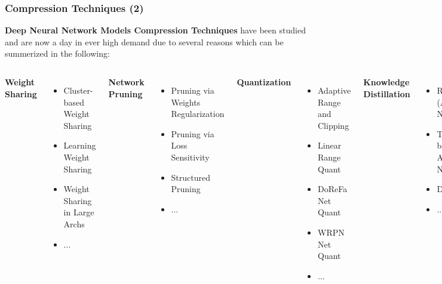 



\begin{frame}

\frametitle{Compression Techniques (2)}

\textbf{Deep Neural Network Models Compression Techniques} have been studied and are now a day in ever high demand due to several reasons which can be summerized in the following:

\begin{columns}

\textbf{Weight Sharing}
\begin{itemize}
\item Cluster-based Weight Sharing
\item Learning Weight Sharing
\item Weight Sharing in Large Archs
\item ...
\end{itemize}


\textbf{Network Pruning}
\begin{itemize}
\item Pruning via Weights Regularization
\item Pruning via Loss Sensitivity
\item Structured Pruning
\item ...
\end{itemize}


\textbf{Quantization}
\begin{itemize}
\item Adaptive Range and Clipping
\item Linear Range Quant
\item DoReFa Net Quant
\item WRPN Net Quant
\item ...
\end{itemize}


\textbf{Knowledge Distillation}
\begin{itemize}
\item Recurrent (Autoregressive) NNs
\item Transformer-based (Non-Autoregressive) NNs
\item Data Free KD
\item ...
\end{itemize}

\end{columns}

\end{frame}
